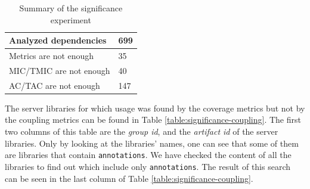\begin{table}[ht!]
\begin{center}
\begin{tabular}{l|l}
  \hline
  Analyzed dependencies   & 699 \\\hline
  Metrics are not enough  & 35  \\\hline
  MIC/TMIC are not enough & 40  \\\hline
  AC/TAC are not enough   & 147 \\\hline
\end{tabular}
\end{center}
\caption{Summary of the significance experiment}
\label{table:summary-significance}
\end{table}

The server libraries for which usage was found by the coverage metrics but not by the coupling metrics can be found in Table \ref{table:significance-coupling}. The first two columns of this table are the \textit{group id}, and the \textit{artifact id} of the server libraries. Only by looking at the libraries' names, one can see that some of them are libraries that contain \texttt{annotations}. We have checked the content of all the libraries to find out which include only \texttt{annotations}. The result of this search can be seen in the last column of Table \ref{table:significance-coupling}.

